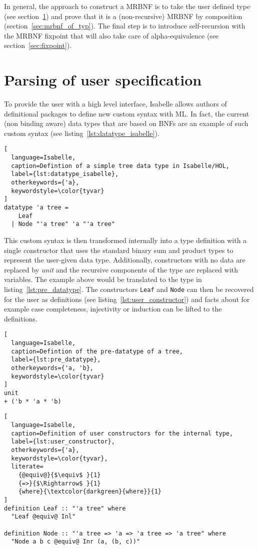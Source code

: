 In general, the approach to construct a \ac{MRBNF} is to take the user defined type (see section~\ref{sec:user_spec}) and prove that it is a (non-recursive) \ac{MRBNF} by composition (section~\ref{sec:mrbnf_of_typ}). The final step is to introduce self-recursion with the \ac{MRBNF} fixpoint that will also take care of alpha-equivalence (see section~\ref{sec:fixpoint}).

\section{Parsing of user specification}\label{sec:user_spec}

To provide the user with a high level interface, Isabelle allows authors of definitional packages to define new custom syntax with ML. In fact, the current (non binding aware) data types that are based on \acp{BNF} are an example of such custom syntax (see listing~\ref{lst:datatype_isabelle}).

\begin{minipage}{\textwidth}
\begin{lstlisting}[
  language=Isabelle,
  caption=Defintion of a simple tree data type in Isabelle/HOL,
  label={lst:datatype_isabelle},
  otherkeywords={'a},
  keywordstyle=\color{tyvar}
]
datatype 'a tree =
    Leaf
  | Node "'a tree" 'a "'a tree"
\end{lstlisting}
\end{minipage}

This custom syntax is then transformed internally into a type definition with a single constructor that uses the standard binary sum and product types to represent the user-given data type. Additionally, constructors with no data are replaced by \textit{unit} and the recursive components of the type are replaced with variables. The example above would be translated to the type in listing~\ref{lst:pre_datatype}. The constructors \texttt{Leaf} and \texttt{Node} can then be recovered for the user as definitions (see listing~\ref{lst:user_constructor}) and facts about for example case completeness, injectivity or induction can be lifted to the definitions.

\begin{lstlisting}[
  language=Isabelle,
  caption=Defintion of the pre-datatype of a tree,
  label={lst:pre_datatype},
  otherkeywords={'a, 'b},
  keywordstyle=\color{tyvar}
]
unit
+ ('b * 'a * 'b)
\end{lstlisting}

\begin{lstlisting}[
  language=Isabelle,
  caption=Definition of user constructors for the internal type,
  label={lst:user_constructor},
  otherkeywords={'a},
  keywordstyle=\color{tyvar},
  literate=
    {@equiv@}{$\equiv$ }{1}
    {=>}{$\Rightarrow$ }{1}
    {where}{\textcolor{darkgreen}{where}}{1}
]
definition Leaf :: "'a tree" where
  "Leaf @equiv@ Inl"

definition Node :: "'a tree => 'a => 'a tree => 'a tree" where
  "Node a b c @equiv@ Inr (a, (b, c))"
\end{lstlisting}

